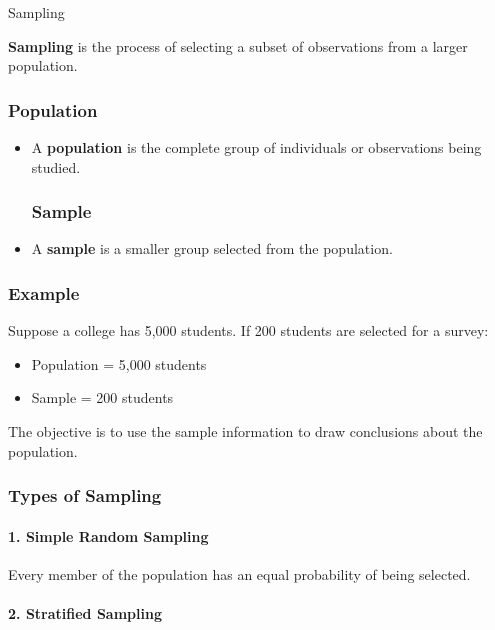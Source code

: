 \documentclass[aspectratio=169]{beamer}
\begin{document}
\begin{frame}{Sampling}


\textbf{Sampling} is the process of selecting a subset of observations
from a larger population.

\subsubsection*{Population}
\begin{itemize}
    \item A \textbf{population} is the complete group of individuals or
observations being studied.

\subsubsection*{Sample}

     \item A \textbf{sample} is a smaller group selected from the population.
\end{itemize}
\subsubsection*{Example}

Suppose a college has 5,000 students. If 200 students are selected for
a survey:

\begin{itemize}
    \item Population = 5,000 students
    \item Sample = 200 students
\end{itemize}

The objective is to use the sample information to draw conclusions
about the population.

\subsubsection*{Types of Sampling}

\paragraph{\textbf{1. Simple Random Sampling}}

Every member of the population has an equal probability of being
selected.

\paragraph{\textbf{2. Stratified Sampling}}


\end{frame}
\end{document}
